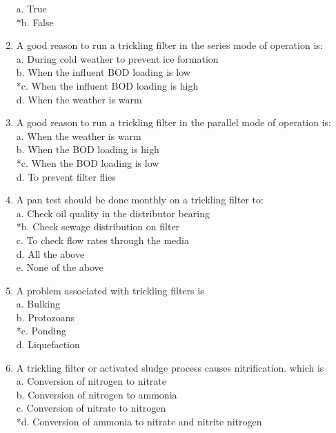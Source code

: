 \begin{enumerate}
a. True \\
*b. False \\

\item  A good reason to run a trickling filter in the series mode of operation is: \\

 a. During cold weather to prevent ice formation \\
 b. When the influent BOD loading is low \\
 *c. When the influent BOD loading is high \\
 d. When the weather is warm \\


\item  A good reason to run a trickling filter in the parallel mode of operation is: \\

 a. When the weather is warm \\
 b. When the BOD loading is high \\
 *c. When the BOD loading is low \\
 d. To prevent filter flies \\


\item  A pan test should be done monthly on a trickling filter to: \\

 a. Check oil quality in the distributor bearing \\
 *b. Check sewage distribution on filter \\
 c. To check flow rates through the media \\
 d. All the above \\
 e. None of the above \\


\item  A problem associated with trickling filters is \\

 a. Bulking \\
 b. Protozoans \\
 *c. Ponding \\
 d. Liquefaction \\


\item  A trickling filter or activated sludge process causes nitrification. which is \\

 a. Conversion of nitrogen to nitrate \\
 b. Conversion of nitrogen to ammonia \\
 c. Conversion of nitrate to nitrogen \\
 *d. Conversion of ammonia to nitrate and nitrite nitrogen \\



\end{enumerate}
